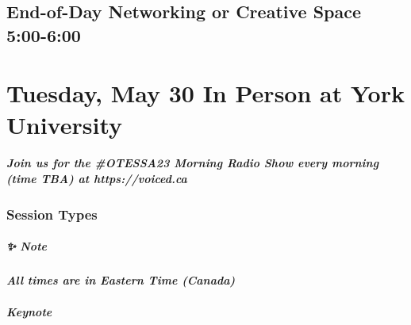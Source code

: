 \documentclass[
]{book}
\begin{document}
\hypertarget{end-of-day-networking-or-creative-space-500-600}{%
\section*{End-of-Day Networking or Creative Space \textbar{} 5:00-6:00}\label{end-of-day-networking-or-creative-space-500-600}}

\hypertarget{tuesday-may-30-in-person-at-york-university}{%
\chapter{Tuesday, May 30 \textbar{} In Person at York University}\label{tuesday-may-30-in-person-at-york-university}}

\begin{protip}
\hypertarget{join-us-for-the-otessa23-morning-radio-show-every-morning-time-tba-at-httpsvoiced.ca}{%
\paragraph{Join us for the \#OTESSA23 Morning Radio Show every morning
(time TBA) at
https://voiced.ca}\label{join-us-for-the-otessa23-morning-radio-show-every-morning-time-tba-at-httpsvoiced.ca}}
\end{protip}

\hypertarget{session-types-2}{%
\subsection*{Session Types}\label{session-types-2}}

\begin{protip}
\hypertarget{note}{%
\paragraph*{✨ Note}\label{note}}

\textbf{\emph{All times are in Eastern Time (Canada)}}
\end{protip}

\begin{keynote}
\hypertarget{keynote}{%
\paragraph{Keynote}\label{keynote}}
\end{keynote}
\end{document}
